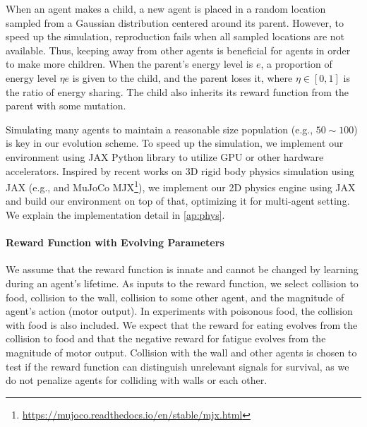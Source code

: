 When an agent makes a child, a new agent is placed in a random location sampled from a Gaussian distribution centered around its parent. However, to speed up the simulation, reproduction fails when all sampled locations are not available. Thus, keeping away from other agents is beneficial for agents in order to make more children. When the parent's energy level is $e$, a proportion of energy level $\eta e$ is given to the child, and the parent loses it, where $\eta \in [0, 1]$ is the ratio of energy sharing. The child also inherits its reward function from the parent with some mutation.

Simulating many agents to maintain a reasonable size population (e.g., $50\sim 100$) is key in our evolution scheme. To speed up the simulation, we implement our environment using JAX Python library \citep{jax2018github} to utilize GPU or other hardware accelerators. Inspired by recent works on 3D rigid body physics simulation using JAX (e.g., \citet{brax2021github} and MuJoCo \citep{todorov2012mujoco} MJX\footnote{\url{https://mujoco.readthedocs.io/en/stable/mjx.html}}), we implement our 2D physics engine using JAX and build our environment on top of that, optimizing it for multi-agent setting. We explain the implementation detail in \cref{ap:phys}.

\paragraph{Reward Function with Evolving Parameters}
We assume that the reward function is innate and cannot be changed by learning during an agent's lifetime. As inputs to the reward function, we select  collision to food,  collision to the wall,  collision to some other agent, and  the magnitude of agent's action (motor output). In experiments with poisonous food, the collision with food is also included. We expect that the reward for eating evolves from the collision to food and that the negative reward for fatigue evolves from the magnitude of motor output. Collision with the wall and other agents is chosen to test if the reward function can distinguish unrelevant signals for survival, as we do not penalize agents for colliding with walls or each other.

